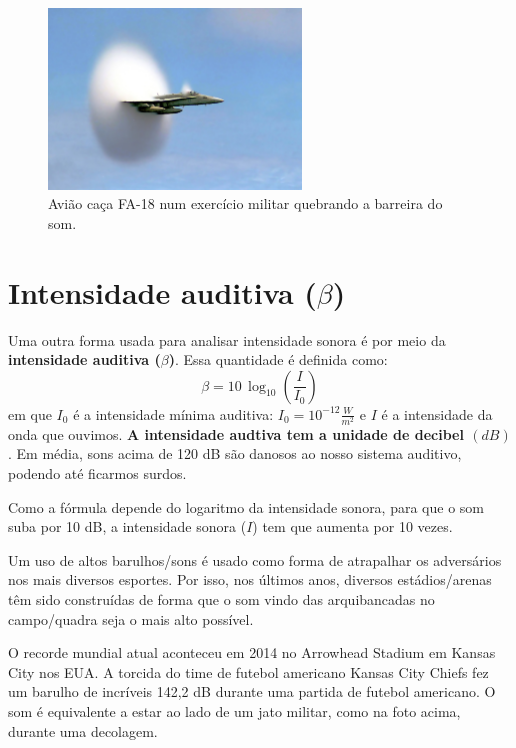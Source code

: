 \documentclass[12pt]{extarticle}
\newcommand{\<}{\langle}
\renewcommand{\>}{\rangle}
\theoremstyle{definition}
\begin{document}
\begin{figure}[H]
    \centering
    \includegraphics[width=0.6\textwidth]{FA-18_Hornet_breaking_sound_barrier_(7_July_1999)_-_filtered.jpg}
    \caption{Avião caça FA-18 num exercício militar quebrando a barreira do som.}
    \label{fig:barreira do som}
\end{figure}

\section{Intensidade auditiva ($\beta$)}

Uma outra forma usada para analisar intensidade sonora é por meio da \textbf{intensidade auditiva ($\beta$)}. Essa quantidade é definida como:
\begin{equation}
    \beta = 10\,\log_{10}\left(\frac{I}{I_0}\right)
\end{equation}
\noindent em que $I_0$ é a intensidade mínima auditiva: $I_0 = 10^{-12}\frac{W}{m^2}$ e $I$ é a intensidade da onda que ouvimos. \textbf{A intensidade audtiva tem a unidade de decibel $(dB)$}. Em média, sons acima de 120 dB são danosos ao nosso sistema auditivo, podendo até ficarmos surdos. 

Como a fórmula depende do logaritmo da intensidade sonora, para que o som suba por 10 dB, a intensidade sonora ($I$) tem que aumenta por 10 vezes.

Um uso de altos barulhos/sons é usado como forma de atrapalhar os adversários nos mais diversos esportes. Por isso, nos últimos anos, diversos estádios/arenas têm sido construídas de forma que o som vindo das arquibancadas no campo/quadra seja o mais alto possível. 

O recorde mundial atual aconteceu em 2014 no Arrowhead Stadium em Kansas City nos EUA. A torcida do time de futebol americano Kansas City Chiefs fez um barulho de incríveis 142,2 dB durante uma partida de futebol americano. O som é equivalente a estar ao lado de um jato militar, como na foto acima, durante uma decolagem.
\end{document}
